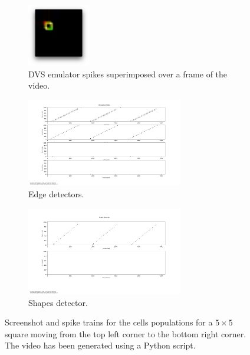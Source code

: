 \begin{figure}[ht]
\centering

\begin{subfigure}{\textwidth}
\centering
\includegraphics[width=0.3\textwidth]{images/appendix_evaluation/square_diag_spikes.png}
\caption{DVS emulator spikes superimposed over a frame of the video.}
\label{fig:square_diag_spikes}
\end{subfigure}

\begin{subfigure}{\textwidth}
\centering
\includegraphics[width=0.75\textwidth]{images/appendix_evaluation/square_diag_receptive_fields.png} 
\caption{Edge detectors.}
\label{fig:square_diag_receptive_fields}
\end{subfigure}

\begin{subfigure}{\textwidth}
\centering
\includegraphics[width=0.75\textwidth]{images/appendix_evaluation/square_diag_shape.png}
\caption{Shapes detector.}
\label{fig:square_diag_shape}
\end{subfigure}

\caption[$5\times 5$ Square Moving Diagonally]{Screenshot and spike trains for the cells populations for a $5\times 5$ square moving from the top left corner to the bottom right corner. The video has been generated using a Python script.}
\label{fig:square_diag_ev}
\end{figure}
